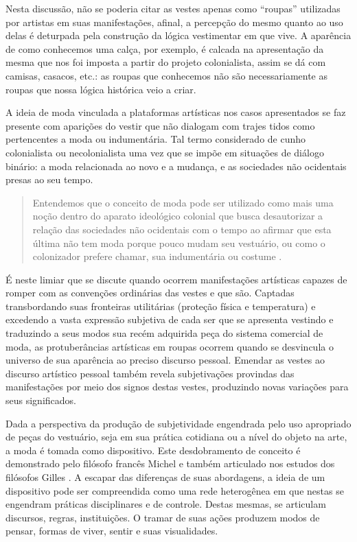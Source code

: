 \begin{refsection}
    Nesta discussão, não se poderia citar as vestes apenas como ``roupas'' utilizadas por artistas em suas manifestações, afinal, a percepção do mesmo quanto ao uso delas é deturpada pela construção da lógica vestimentar em que vive. A aparência de como conhecemos uma calça, por exemplo, é calcada na apresentação da mesma que nos foi imposta a partir do projeto colonialista, assim se dá com camisas, casacos, etc.: as roupas que conhecemos não são necessariamente as roupas que nossa lógica histórica veio a criar.  

    A ideia de moda vinculada a plataformas artísticas nos casos apresentados se faz presente com aparições do vestir que não dialogam com trajes tidos como pertencentes a moda ou indumentária. Tal termo considerado de cunho colonialista ou necolonialista uma vez que se impõe em situações de diálogo binário: a moda relacionada ao novo e a mudança, e as sociedades não ocidentais presas ao seu tempo. 

    \begin{quotation}
        Entendemos que o conceito de moda pode ser utilizado como mais uma noção dentro do aparato ideológico colonial que busca desautorizar a relação das sociedades não ocidentais com o tempo ao afirmar que esta última não tem moda porque pouco mudam seu vestuário, ou como o colonizador prefere chamar, sua indumentária ou costume \cite[p.~6]{Santos2020Analise}.
    \end{quotation}

    É neste limiar que se discute quando ocorrem manifestações artísticas capazes de romper com as convenções ordinárias das vestes e que são. Captadas transbordando suas fronteiras utilitárias (proteção física e temperatura) e excedendo a vasta expressão subjetiva de cada ser que se apresenta vestindo e traduzindo a seus modos sua recém adquirida peça do sistema comercial de moda, as protuberâncias artísticas em roupas ocorrem quando se desvincula o universo de sua aparência ao preciso discurso pessoal. Emendar as vestes ao discurso artístico pessoal também revela subjetivações provindas das manifestações por meio dos signos destas vestes, produzindo novas variações para seus significados.  

    Dada a perspectiva da produção de subjetividade engendrada pelo uso apropriado de peças do vestuário, seja em sua prática cotidiana ou a nível do objeto na arte, a moda é tomada como dispositivo. Este desdobramento de conceito é demonstrado pelo filósofo francês Michel \textcite{Foucault1979Microfisica} e também articulado nos estudos dos filósofos Gilles \textcite{Deleuze1990Que}. A escapar das diferenças de suas abordagens, a ideia de um dispositivo pode ser compreendida como uma rede heterogênea em que nestas se engendram práticas disciplinares e de controle. Destas mesmas, se articulam discursos, regras, instituições. O tramar de suas ações produzem modos de pensar, formas de viver, sentir e suas visualidades.  


\end{refsection}
